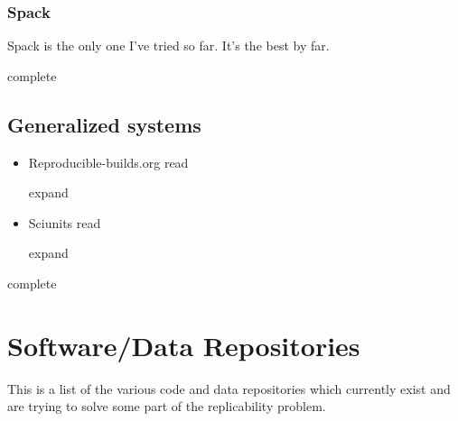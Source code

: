 \documentclass[american]{article}
\newcommand{\Read}{
	\gls{read}
}
\newcommand{\complete}{
	\gls{complete}
}
\newcommand{\expand}{
	\gls{expand}
}
\begin{document}
\subsubsection{Spack} \label{sec:spack}

Spack \cite{Spack} is the only one I've tried so far. It's the best by far.

\complete

\subsection{Generalized systems} \label{sec:software-generalized}

\begin{itemize}
\item Reproducible-builds.org \cite{reproducible-builds} \Read \expand
\item Sciunits \cite{sciunits} \Read \expand
\end{itemize}

\complete

\section{Software/Data Repositories} \label{sec:repositories}

This is a list of the various code and data repositories which currently exist and are trying to solve some part of the replicability problem.
\end{document}
